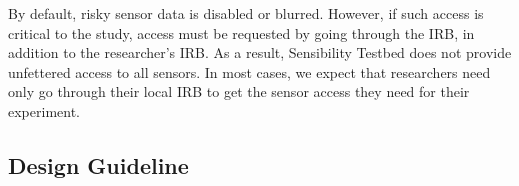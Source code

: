 By default, risky sensor data is disabled or blurred. However, if such 
access is critical to the study, access must be requested by going through 
the \sysname IRB, in addition to the researcher's IRB. 
%
%
%
As a result, Sensibility Testbed does not
provide unfettered access to all sensors. 
In most cases, we expect
that researchers need only go through their local IRB to get
the sensor access they need for their experiment. 


\subsection{Design Guideline}\label{sec-principles}

